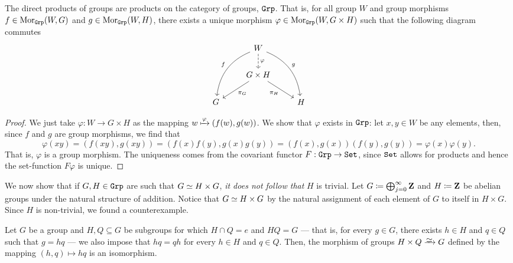 \begin{proposition}
    The direct products of groups are products on the category of groups,
    \({\texttt{Grp}}\). That is, for all group \(W\) and group morphisms \(f \in
    \operatorname{Mor}_{\texttt{Grp}}(W, G)\) and \(g \in \operatorname{Mor}_{\texttt{Grp}}(W, H)\), there exists a unique
    morphism \(\varphi \in \operatorname{Mor}_{\texttt{Grp}}(W, G \times H)\) such that the following
    diagram commutes
    \[
        \begin{tikzcd}
            &W
            \ar[d, dashed, "\varphi"]
            \ar[ddr, bend left, "g"]
            \ar[ddl, swap, bend right, "f"]
            & \\
            &G \times H \ar[dr, swap, "\pi_H"] \ar[dl, "\pi_G"] & \\
            G & &H
        \end{tikzcd}
    \]
\end{proposition}

\begin{proof}
    We just take \(\varphi: W \to G \times H\) as the mapping \(w \xmapsto \varphi
    (f(w), g(w))\). We show that \(\varphi\) exists in \({\texttt{Grp}}\): let \(x, y \in
    W\) be any elements, then, since \(f\) and \(g\) are group morphisms, we find
    that
    \[
        \varphi(xy) = (f(xy), g(xy)) = (f(x) f(y), g(x) g(y))
        = (f(x), g(x)) (f(y), g(y)) = \varphi(x) \varphi(y).
    \]
    That is, \(\varphi\) is a group morphism. The uniqueness comes from the
    covariant functor \(F: {\texttt{Grp}} \to {\texttt{Set}}\), since \({\texttt{Set}}\) allows for products and
    hence the set-function \(F \varphi\) is unique.
\end{proof}

\begin{remark}
    We now show that if \(G, H \in {\texttt{Grp}}\) are such that \(G \simeq H \times G\),
    \emph{it does not follow that} \(H\) is trivial.
    Let \(G \coloneq \bigoplus_{j=0}^{\infty} \mathbf{Z}\) and \(H \coloneq \mathbf{Z}\) be abelian
    groups under the natural structure of addition. Notice that \(G \simeq H \times
    G\) by the natural assignment of each element of \(G\) to itself in \(H \times
    G\). Since \(H\) is non-trivial, we found a counterexample.
\end{remark}

\begin{proposition}
    \label{prop:product-subgroups-isomorphism}
    Let \(G\) be a group and \(H, Q \subseteq G\) be subgroups for which \(H \cap Q
    = e\) and \(H Q = G\) --- that is, for every \(g \in G\), there exists \(h \in
    H\) and \(q \in Q\) such that \(g = h q\) --- we also impose that \(h q = q h\)
    for every \(h \in H\) and \(q \in Q\). Then, the morphism of groups \(H \times Q
    \isoto G\) defined by the mapping \((h, q) \mapsto hq\) is an isomorphism.
\end{proposition}

